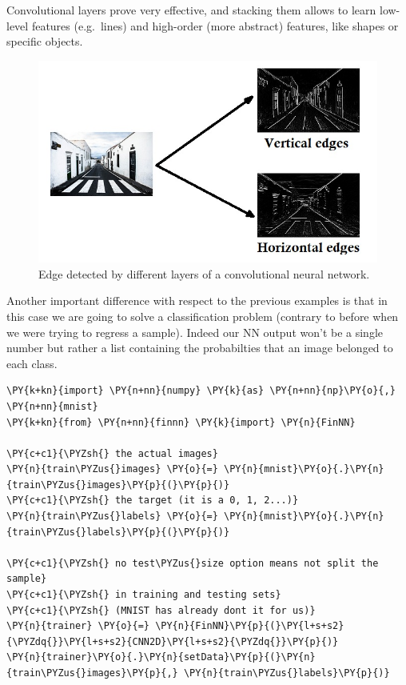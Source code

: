 Convolutional layers prove very effective, and stacking them allows to
learn low-level features (e.g.~lines) and high-order (more abstract)
features, like shapes or specific objects.

\begin{figure}[htb]
	\centering
	\includegraphics[width=1.\textwidth]{figures/edges.jpg}
	\caption{Edge detected by different layers of a convolutional neural network.}
\end{figure}

Another important difference with respect to the previous examples is
that in this case we are going to solve a classification problem
(contrary to before when we were trying to regress a sample). Indeed our
NN output won't be a single number but rather a list containing the
probabilties that an image belonged to each class.

\begin{tcolorbox}[breakable, size=fbox, boxrule=1pt, pad at break*=1mm,colback=cellbackground, colframe=cellborder]
\begin{Verbatim}[commandchars=\\\{\}]
\PY{k+kn}{import} \PY{n+nn}{numpy} \PY{k}{as} \PY{n+nn}{np}\PY{o}{,} \PY{n+nn}{mnist}
\PY{k+kn}{from} \PY{n+nn}{finnn} \PY{k}{import} \PY{n}{FinNN}
	
\PY{c+c1}{\PYZsh{} the actual images}
\PY{n}{train\PYZus{}images} \PY{o}{=} \PY{n}{mnist}\PY{o}{.}\PY{n}{train\PYZus{}images}\PY{p}{(}\PY{p}{)} 
\PY{c+c1}{\PYZsh{} the target (it is a 0, 1, 2...)}
\PY{n}{train\PYZus{}labels} \PY{o}{=} \PY{n}{mnist}\PY{o}{.}\PY{n}{train\PYZus{}labels}\PY{p}{(}\PY{p}{)} 
	
\PY{c+c1}{\PYZsh{} no test\PYZus{}size option means not split the sample}
\PY{c+c1}{\PYZsh{} in training and testing sets}
\PY{c+c1}{\PYZsh{} (MNIST has already dont it for us)}
\PY{n}{trainer} \PY{o}{=} \PY{n}{FinNN}\PY{p}{(}\PY{l+s+s2}{\PYZdq{}}\PY{l+s+s2}{CNN2D}\PY{l+s+s2}{\PYZdq{}}\PY{p}{)}
\PY{n}{trainer}\PY{o}{.}\PY{n}{setData}\PY{p}{(}\PY{n}{train\PYZus{}images}\PY{p}{,} \PY{n}{train\PYZus{}labels}\PY{p}{)}
\end{Verbatim}
\end{tcolorbox}

